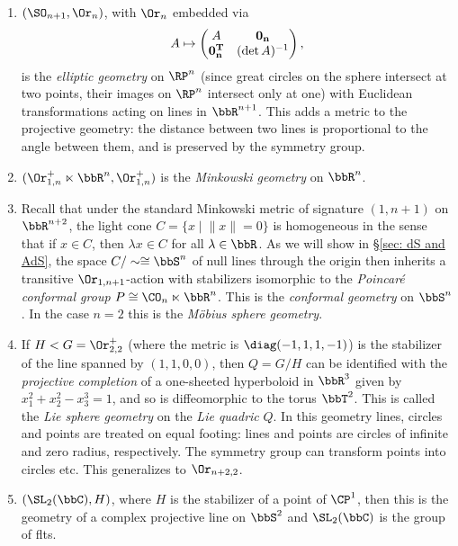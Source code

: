 \begin{example}
\begin{enumerate}
        \item $(\SO_{n+1},\Or_n)$, with $\Or_n$ embedded via
        \[A\mapsto \begin{pmatrix}
            A& \bf{0}_n\\\bf{0}_n^T & (\det A)^{-1}
        \end{pmatrix},\]
        is the \emph{elliptic geometry} on $\RP^n$ (since great circles on the sphere intersect at two points, their images on $\RP^n$ intersect only at one) with Euclidean transformations acting on lines in $\bbR^{n+1}$. This adds a metric to the projective geometry: the distance between two lines is proportional to the angle between them, and is preserved by the symmetry group.

        \item $(\Or_{1,n}^+\ltimes\bbR^n,\Or_{1,n}^+)$ is the \emph{Minkowski geometry} on $\bbR^n$.

        \item Recall that under the standard Minkowski metric of signature $(1,n+1)$ on $\bbR^{n+2}$, the light cone $C=\{x\mid \lVert x\rVert=0\}$ is homogeneous in the sense that if $x\in C$, then $\lambda x\in C$ for all $\lambda\in\bbR$. As we will show in \S\ref{sec: dS and AdS}, the space $C\slash \sim\cong\bbS^n$ of null lines through the origin then inherits a transitive $\Or_{1,n+1}$-action with stabilizers isomorphic to the \emph{Poincar\'e conformal group} $P\cong \CO_n\ltimes \bbR^n$. This is the \emph{conformal geometry} on $\bbS^n$. In the case $n=2$ this is the \emph{M\"obius sphere geometry}.

        \item If $H<G=\Or_{2,2}^+$ (where the metric is $\diag(-1,1,1,-1)$) is the stabilizer of the line spanned by $(1,1,0,0)$, then $Q=G\slash H$ can be identified with the \emph{projective completion} of a one-sheeted hyperboloid in $\bbR^3$ given by $x_1^2+x_2^2-x_3^3=1$, and so is diffeomorphic to the torus $\bbT^2$. This is called the \emph{Lie sphere geometry} on the \emph{Lie quadric} $Q$. In this geometry lines, circles and points are treated on equal footing: lines and points are circles of infinite and zero radius, respectively. The symmetry group can transform points into circles etc. This generalizes to $\Or_{n+2,2}$.

        \item $(\SL_2(\bbC),H)$, where $H$ is the stabilizer of a point of $\CP^1$, then this is the geometry of a complex projective line on $\bbS^2$ and $\SL_2(\bbC)$ is the group of \glspl{flt}.
    \end{enumerate}
\end{example}









